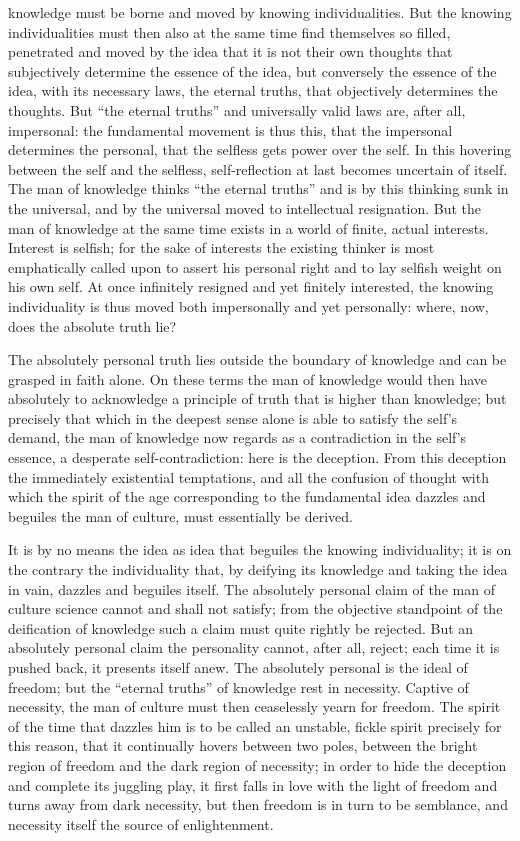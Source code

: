 \documentclass[12pt]{book}
\newcommand{\opage}[1]{\marginnote{\footnotesize\textit{[#1]}}}
\begin{document}
knowledge must be borne and moved by knowing individualities. But the
knowing individualities must then also at the same time find themselves
so filled, penetrated and moved by the idea that it is not their own
thoughts that subjectively determine the essence of the idea, but
conversely the essence of the idea, with its necessary laws, the eternal
truths, that objectively determines the thoughts. But ``the eternal
truths'' and universally valid laws are, after all, impersonal: the
fundamental movement is thus this, that the impersonal determines the
personal, that the selfless gets power over the self. In this hovering
between the self and the selfless, self-reflection at last becomes
uncertain of itself. The man of knowledge thinks ``the eternal truths''
and is by this thinking sunk in the universal, and by the universal moved
to intellectual resignation. But the man of knowledge at the same time
exists in a world of finite, actual interests. Interest is selfish; for
the sake of interests the existing thinker is most emphatically called
upon to assert his personal right and to lay selfish weight on his own
self. At once infinitely resigned and yet finitely interested, the
knowing individuality is thus moved both impersonally and yet personally:
where, now, does the absolute truth lie?

The absolutely personal truth lies outside the boundary of knowledge and
can be grasped in faith alone. On these terms the man of knowledge would
then have absolutely to acknowledge a principle of truth that is higher
than knowledge; but precisely that which
\opage{57}\setcounter{footnote}{0}%
in the deepest sense alone is able to satisfy the self's demand, the man
of knowledge now regards as a contradiction in the self's essence, a
desperate self-contradiction: here is the deception. From this deception
the immediately existential temptations, and all the confusion of
thought with which the spirit of the age corresponding to the
fundamental idea dazzles and beguiles the man of culture, must
essentially be derived.

It is by no means the idea as idea that beguiles the knowing
individuality; it is on the contrary the individuality that, by deifying
its knowledge and taking the idea in vain, dazzles and beguiles itself.
The absolutely personal claim of the man of culture science cannot and
shall not satisfy; from the objective standpoint of the deification of
knowledge such a claim must quite rightly be rejected. But an absolutely
personal claim the personality cannot, after all, reject; each time it
is pushed back, it presents itself anew. The absolutely personal is the
ideal of freedom; but the ``eternal truths'' of knowledge rest in
necessity. Captive of necessity, the man of culture must then ceaselessly
yearn for freedom. The spirit of the time that dazzles him is to be
called an unstable, fickle spirit precisely for this reason, that it
continually hovers between two poles, between the bright region of
freedom and the dark region of necessity; in order to hide the deception
and complete its juggling play, it first falls in love with the light of
freedom and turns away from dark necessity, but then freedom is in turn
to be semblance, and necessity itself the source of enlightenment.
\end{document}
